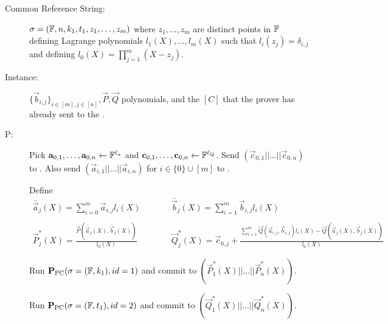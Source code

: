 \begin{description} \label{protmultiversion}
\item[Common Reference String:] $\mathsf{\sigma}=(\mathbb{F},n,k_1,t_1,z_1,\ldots,z_m)$ where $z_1,\ldots,z_m$ are distinct points in $\mathbb{F}$ defining Lagrange polynomials $l_1(X),\ldots,l_m(X)$ such that $l_i(z_j)=\delta_{i,j}$ and defining $l_0(X)=\prod_{j=1}^m(X-z_j)$.
%
\item[Instance:] $\lbrace \vec{b}_{i,j} \rbrace_{i \in [m], j \in [n]}, \vec{P},\vec{Q}$ polynomials, and the $[C]$ that the prover has already sent to the \ILC.
%
\item[P:]
Pick $\mathbf{a}_{0,1},\ldots,\mathbf{a}_{0,n}\gets \mathbb{F}^{\ell_a}$ and $\mathbf{c}_{0,1},\ldots,\mathbf{c}_{0,n}\gets \mathbb{F}^{\ell_Q}$. Send $(\vec{c}_{0,1}||\ldots||\vec{c}_{0,n})$ to \ILC. Also send $\left( \vec{a}_{i,1}||\ldots||\vec{a}_{i,n}\right)$ for $i\in \{0\}\cup [m]$ to \ILC.

Define
$$\begin{array}{lll}
\bar{\vec{a}}_{j}(X) = \sum_{i=0}^m \vec{a}_{i,j} l_i(X) & \qquad &
\bar{\vec{b}}_{j}(X) = \sum_{i=1}^m \vec{b}_{i,j} l_i(X) \\ \\
\vec{P}_j^*(X)=\frac{\vec{P}\left(\bar{\vec{a}}_j(X),\bar{\vec{b}}_j(X)\right)}{l_0(X)} & & \vec{Q}_j^*(X)=\vec{c}_{0,j}+\frac{\sum_{i=1}^m\vec{Q}(\vec{a}_{i,j},\vec{b}_{i,j})l_i(X)-\vec{Q}\left(\bar{\vec{a}}_j(X),\bar{\vec{b}}_j(X)\right)}{l_0(X)}
\end{array}$$

Run $\textbf{P}_\mathrm{PC}(\mathsf{\sigma}=(\mathbb{F},k_1),id=1)$ and commit to $\left( \vec{P}_1^*(X)||\ldots||\vec{P}_n^*(X)\right)$.

Run $\textbf{P}_\mathrm{PC}(\mathsf{\sigma}=(\mathbb{F},t_1),id=2)$ and commit to $\left( \vec{Q}_1^*(X)||\ldots||\vec{Q}_n^*(X)\right)$.


\end{description}

